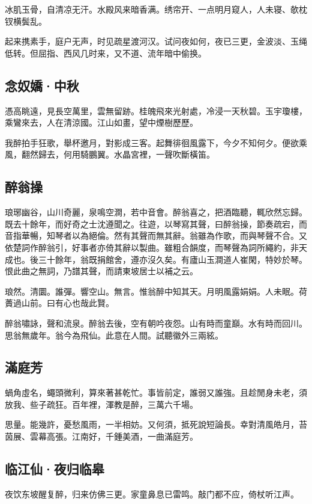 \documentclass[a5paper]{ctexart}
\begin{document}
	冰肌玉骨，自清凉无汗。水殿风来暗香满。绣帘开、一点明月窥人，人未寝、欹枕钗横鬓乱。
	
	起来携素手，庭户无声，时见疏星渡河汉。试问夜如何，夜已三更，金波淡、玉绳低转。但屈指、西风几时来，又不道、流年暗中偷换。
	
	\subsection{念奴嬌·中秋}
	憑高眺遠，見長空萬里，雲無留跡。桂魄飛來光射處，冷浸一天秋碧。玉宇瓊樓，乘鸞來去，人在清涼國。江山如畫，望中煙樹歷歷。
	
	我醉拍手狂歌，舉杯邀月，對影成三客。起舞徘徊風露下，今夕不知何夕。便欲乘風，翻然歸去，何用騎鵬翼。水晶宮裡，一聲吹斷橫笛。
	
	\subsection{醉翁操}
	\begin{small}
		琅琊幽谷，山川奇麗，泉鳴空澗，若中音會。醉翁喜之，把酒臨聽，輒欣然忘歸。既去十餘年，而好奇之士沈遵聞之。往遊，以琴寫其聲，曰醉翁操，節奏疏宕，而音指華暢，知琴者以為絕倫。然有其聲而無其辭。翁雖為作歌，而與琴聲不合。又依楚詞作醉翁引，好事者亦倚其辭以製曲。雖粗合韻度，而琴聲為詞所繩約，非天成也。後三十餘年，翁既捐館舍，遵亦沒久矣。有廬山玉澗道人崔閑，特妙於琴。恨此曲之無詞，乃譜其聲，而請東坡居士以補之云。
	\end{small}
	
	琅然。清圜。誰彈。響空山。無言。惟翁醉中知其天。月明風露娟娟。人未眠。荷蕢過山前。曰有心也哉此賢。
	
	醉翁嘯詠，聲和流泉。醉翁去後，空有朝吟夜怨。山有時而童巔。水有時而回川。思翁無歲年。翁今為飛仙。此意在人間。試聽徽外三兩絃。
	
	\subsection{滿庭芳}
	蝸角虛名，蠅頭微利，算來著甚乾忙。事皆前定，誰弱又誰強。且趁閒身未老，須放我、些子疏狂。百年裡，渾教是醉，三萬六千場。
	
	思量。能幾許，憂愁風雨，一半相妨。又何須，抵死說短論長。幸對清風皓月，苔茵展、雲幕高張。江南好，千鍾美酒，一曲滿庭芳。
	
	\subsection{临江仙·夜归临皋}
	夜饮东坡醒复醉，归来仿佛三更。家童鼻息已雷鸣。敲门都不应，倚杖听江声。
	
\end{document}
